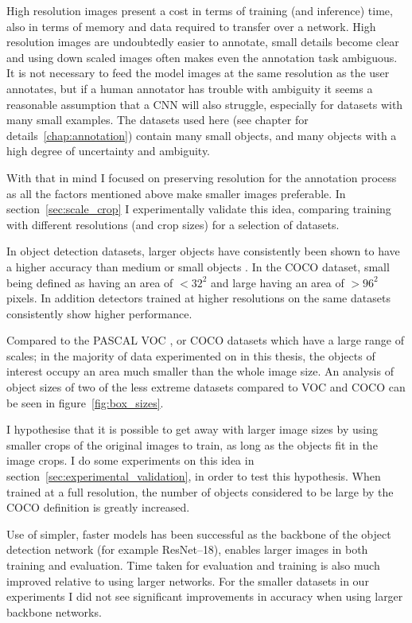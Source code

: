 High resolution images present a cost in terms of training (and inference) time, also in terms of memory and data required to transfer over a network. High resolution images are undoubtedly easier to annotate, small details become clear and using down scaled images often makes even the annotation task ambiguous. It is not necessary to feed the model images at the same resolution as the user annotates, but if a human annotator has trouble with ambiguity it seems a reasonable assumption that a \gls{CNN} will also struggle, especially for datasets with many small examples. The datasets used here (see chapter for details~\ref{chap:annotation}) contain many small objects, and many objects with a high degree of uncertainty and ambiguity.

With that in mind I focused on preserving resolution for the annotation process as all the factors mentioned above make smaller images preferable. In section~\ref{sec:scale_crop} I experimentally validate this idea, comparing training with different resolutions (and crop sizes) for a selection of datasets.

In object detection datasets, larger objects have consistently been shown to have a higher accuracy than medium or small objects \cite{Lin2014, Wang2017, Lin2017a, Law2018, Zhou2019}. In the COCO dataset, small being defined as having an area of $<32^2$ and large having an area of $>96^2$ pixels. In addition detectors trained at higher resolutions on the same datasets consistently show higher performance.

 Compared to the PASCAL VOC \cite{Everingham2008}, or COCO \cite{Lin2014} datasets which have a large range of scales; in the majority of data experimented on in this thesis, the objects of interest occupy an area much smaller than the whole image size. An analysis of object sizes of two of the less extreme datasets compared to VOC and COCO can be seen in figure~\ref{fig:box_sizes}. 

I hypothesise that it is possible to get away with larger image sizes by using smaller crops of the original images to train, as long as the objects fit in the image crops. I do some experiments on this idea in section~\ref{sec:experimental_validation}, in order to test this hypothesis. When trained at a full resolution, the number of objects considered to be large by the COCO definition is greatly increased.

Use of simpler, faster models has been successful as the backbone of the object detection network (for example ResNet--18), enables larger images in both training and evaluation. Time taken for evaluation and training is also much improved relative to using larger networks. For the smaller datasets in our experiments I did not see significant improvements in accuracy when using larger backbone networks.

